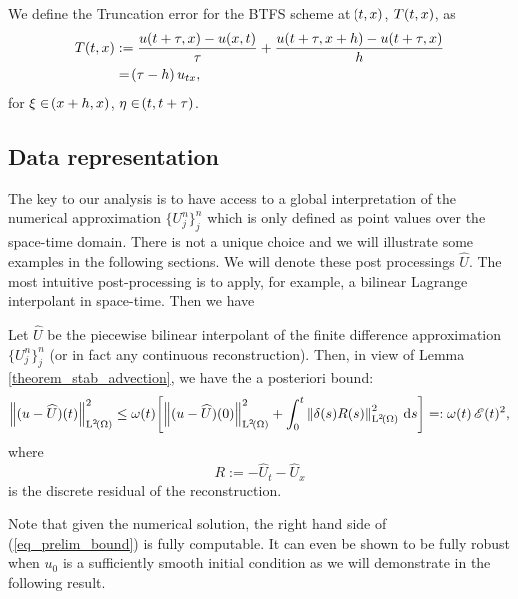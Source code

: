 \documentclass[final]{amsart}
\renewcommand{\d}{\ensuremath{\,\mathrm{d}}}
\numberwithin{equation}{section}
\begin{document}
 \begin{Defn}\label{defn:btfs_truncation}
 	We define the Truncation error for the BTFS scheme at $\!\left({t,x}\right)$, $T\!\left({t,x}\right)$, as
 	\begin{equation}\label{eq:btfs_truncation}
 	\begin{aligned}
 	T\!\left({t,x}\right)&:=\frac{u\!\left({t+\tau,x}\right)-u\!\left({x,t}\right)}{\tau}+\frac{u\!\left({t+\tau,x+h}\right)-u\!\left({t+\tau,x}\right)}{h}\\
 	&=\!\left({ \tau-h}\right)u_{tx},
 	\end{aligned}
 	\end{equation}
 	for $\xi\in\!\left({x+h,x}\right)$, $\eta \in\!\left({t, t+\tau}\right)$.
 \end{Defn}

\subsection{Data representation}

The key to our analysis is to have access to a global interpretation
of the numerical approximation $\{ U^n_j \}_{j}^{n}$ which is only
defined as point values over the space-time domain. There is not a
unique choice and we will illustrate some examples in the following
sections. We will denote these post processings $\widehat U$. The most
intuitive post-processing is to apply, for example, a bilinear
Lagrange interpolant in space-time. Then we have

\begin{Cor}
	\label{cor:aposteriori}
	Let $\widehat U$ be the piecewise bilinear interpolant of the
        finite difference approximation $\{ U^n_j \}_{j}^n$ (or in
        fact any continuous reconstruction). Then, in view of Lemma
        \ref{theorem_stab_advection}, we have the a posteriori bound:
	\begin{equation}\label{eq_prelim_bound}
	\Norm{(u - \widehat{U})\qp{t}}^2_{\leb{2}\qp{\W}}
	\leq
	\w(t)
	\qb{\Norm{(u - \widehat{U})\qp{0}}^2_{\leb{2}\qp{\W}}+\int_0^t\Norm{\delta(s) R(s)}^2_{\leb{2}\qp{\W}}  \d s }
	=: \w\qp{t}\cE(t)^2
	,
	\end{equation}
	where
	\begin{equation}\label{eq:residual_advection}
	R := - \widehat U_t - \widehat U_x
	\end{equation}
	is the discrete residual of the reconstruction.
\end{Cor}

Note that given the numerical solution, the right hand side of
(\ref{eq_prelim_bound}) is fully computable. It can even be shown to
be fully robust when $u_0$ is a sufficiently smooth initial condition
as we will demonstrate in the following result.
\end{document}

